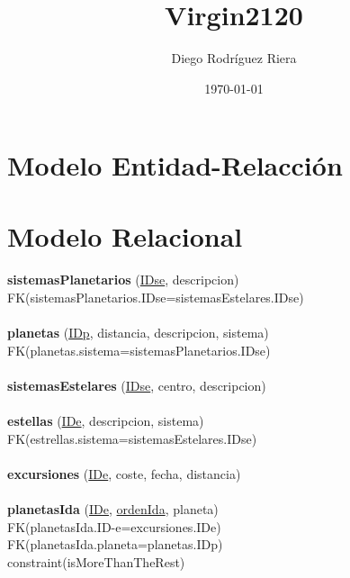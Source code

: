 \documentclass[a4paper,10pt]{article}
\title{Virgin2120}
\author{Diego Rodríguez Riera}
\date{\today}
\newcommand\tab[1][1cm]{\hspace*{#1}}
\begin{document}
\maketitle
\pagebreak
\section{Modelo Entidad-Relacción}
\scalebox{0.44}{}


\pagebreak

\section{Modelo Relacional}
\paragraph{}
{\bf sistemasPlanetarios} (\underline{IDse}, descripcion)\\
\tab FK(sistemasPlanetarios.IDse=sistemasEstelares.IDse)

\paragraph{}
{\bf planetas} (\underline{IDp}, distancia, descripcion, sistema)\\
\tab FK(planetas.sistema=sistemasPlanetarios.IDse)

\paragraph{}
{\bf sistemasEstelares} (\underline{IDse}, centro, descripcion)

\paragraph{}
{\bf estellas} (\underline{IDe}, descripcion, sistema)\\
\tab FK(estrellas.sistema=sistemasEstelares.IDse)

\paragraph{}
{\bf excursiones} (\underline{IDe}, coste, fecha, distancia)

\paragraph{}
{\bf planetasIda} (\underline{IDe}, \underline{ordenIda}, planeta)\\
\tab FK(planetasIda.ID-e=excursiones.IDe)\\
\tab FK(planetasIda.planeta=planetas.IDp)\\
\tab constraint(isMoreThanTheRest)
\end{document}
